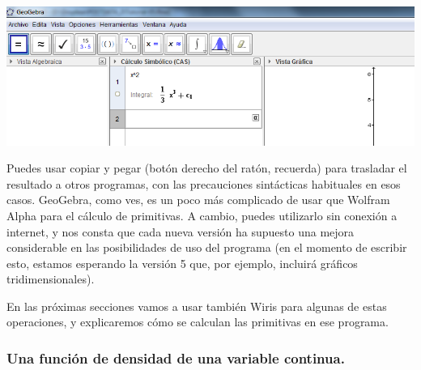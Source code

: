 \documentclass[10pt,a4paper]{article}\usepackage[]{graphicx}\usepackage[]{color}
\newcounter{cont01}
\begin{document}
\begin{center}
    \includegraphics[width=15cm]{../fig/Tut05-46.png}
\end{center}
Puedes usar copiar y pegar (botón derecho del ratón, recuerda) para trasladar el resultado a otros programas, con las precauciones sintácticas habituales en esos casos.
GeoGebra, como ves, es un poco más complicado de usar que Wolfram Alpha para el cálculo de primitivas. A cambio, puedes utilizarlo sin conexión a internet, y nos consta que cada nueva versión ha supuesto una mejora considerable en las posibilidades de uso del programa (en el momento de escribir esto, estamos esperando la versión 5 que, por ejemplo, incluirá gráficos tridimensionales).

En las próximas secciones vamos a usar también Wiris para algunas de estas operaciones, y explicaremos cómo se calculan las primitivas en ese programa.

\subsubsection{Una función de densidad de una variable continua.}
\end{document}

